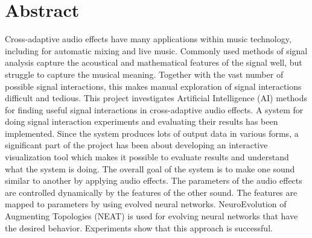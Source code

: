 \section*{Abstract}
Cross-adaptive audio effects have many applications within music technology, including for automatic mixing and live music. Commonly used methods of signal analysis capture the acoustical and mathematical features of the signal well, but struggle to capture the musical meaning. Together with the vast number of possible signal interactions, this makes manual exploration of signal interactions difficult and tedious. This project investigates Artificial Intelligence (AI) methods for finding useful signal interactions in cross-adaptive audio effects. A system for doing signal interaction experiments and evaluating their results has been implemented. Since the system produces lots of output data in various forms, a significant part of the project has been about developing an interactive visualization tool which makes it possible to evaluate results and understand what the system is doing. The overall goal of the system is to make one sound similar to another by applying audio effects. The parameters of the audio effects are controlled dynamically by the features of the other sound. The features are mapped to parameters by using evolved neural networks. NeuroEvolution of Augmenting Topologies (NEAT) is used for evolving neural networks that have the desired behavior. Experiments show that this approach is successful.
